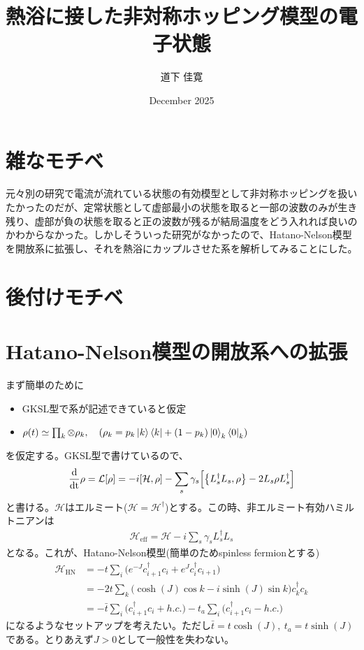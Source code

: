 \documentclass[dvipdfmx,autodetect-engine]{jsarticle}
\title{熱浴に接した非対称ホッピング模型の電子状態}
\author{道下 佳寛}
\date{December 2025}
\newcommand{\da}{\dagger}
\newcommand{\m}[1]{\mathcal{#1}}
\newcommand{\mr}[1]{\mathrm{#1}}
\newcommand{\dt}{\frac{\mr{d}}{\mr{dt}}}
\newcommand{\sbv}[1]{\bigl(#1\bigr)}
\begin{document}
\maketitle

\section{雑なモチベ}
元々別の研究で電流が流れている状態の有効模型として非対称ホッピングを扱いたかったのだが、定常状態として虚部最小の状態を取ると一部の波数のみが生き残り、虚部が負の状態を取ると正の波数が残るが結局温度をどう入れれば良いのかわからなかった。しかしそういった研究がなかったので、Hatano-Nelson模型を開放系に拡張し、それを熱浴にカップルさせた系を解析してみることにした。

\section{後付けモチベ}

\section{Hatano-Nelson模型の開放系への拡張}
まず簡単のために
\begin{itemize}
    \item GKSL型で系が記述できていると仮定
    \item $\rho(t) \simeq \prod_k \otimes\rho_k, \ \ \  (\rho_k = p_k\ket{k}\bra{k} + (1-p_k)\ket{0}_k\bra{0}_k)$
\end{itemize}
を仮定する。GKSL型で書けているので、
\begin{align}
    \dt \rho = \m{L}[\rho] = -i[\m{H}, \rho] - \sum_s \gamma_s \Bigl[\bigl\{L_s^\da L_s, \rho\bigr\}-2L_s\rho L_s^\da\Bigr]\label{GKSL}
\end{align}
と書ける。$\m{H}$はエルミート($\m{H} = \m{H}^\da$)とする。この時、非エルミート有効ハミルトニアンは
\begin{align}
    \m{H}_{\mr{eff}} = \m{H} - i\sum_s \gamma_s L^\da_s L_s \label{Heff}
\end{align}
となる。これが、Hatano-Nelson模型(簡単のためspinless fermionとする)
\begin{align}
    \m{H}_{\mr{HN}} &= -t\sum_i \bigl(e^{-J}c^\da_{i+1}c_i + e^{J}c^\da_{i}c_{i+1}\bigr)\label{HN}\\
    &= -2t\sum_k \bigl(\cosh{(J)}\cos{k} - i\sinh{(J)}\sin{k}\bigr)c^\da_kc_k\label{HN_k}\\
    &= -\bar{t}\sum_i \sbv{c^\da_{i+1}c_i + h.c.} -t_a\sum_i \sbv{c^\da_{i+1}c_i - h.c.}
\end{align}
になるようなセットアップを考えたい。ただし$\bar{t} = t\cosh{(J)}, \ t_a = t\sinh{(J)}$である。とりあえず$J>0$として一般性を失わない。
\end{document}
